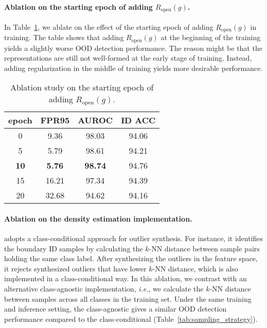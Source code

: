 \vspace{-0.7cm}
\paragraph{Ablation on the starting epoch of  adding $R_\text{open}(g)$.}  In Table~\ref{tab:beginning_epoch}, we ablate on the effect of the starting epoch of adding $R_{\text{open}}(g)$ in training. The table shows that adding $R_{\text{open}}(g)$ at the beginning of the training yields a slightly worse OOD detection performance. The reason might be that the representations are still not well-formed at the early stage of training. Instead, adding regularization in the middle of training yields more desirable performance. 

\begin{table}[!h]
    \centering
    \small 
    \vspace{-0.3cm}
    \caption{Ablation study on the starting epoch of adding $R_{\text{open}}(g)$.}
     \begin{tabular}{c|ccc}
      \toprule
     epoch& FPR95 & AUROC & ID ACC  \\
      \midrule
     0& 9.36	&98.03&	94.06   \\
      5	& 5.79	& 98.61& 	94.21 \\
     \textbf{10}	&\textbf{5.76}  & \textbf{98.74}   & 94.76\\
   15	&16.21&	97.34	&94.39\\
     20	&32.68	&94.62	&94.16\\
      \bottomrule
      \end{tabular}\label{tab:beginning_epoch}\vspace{-1em}
  \end{table}



\paragraph{Ablation on the density estimation implementation.} \model adopts a class-conditional approach for outlier synthesis. For instance, it identifies the boundary ID samples by calculating the $k$-NN distance between sample pairs holding the same class label. After synthesizing the outliers in the feature space, it rejects synthesized outliers that have lower $k$-NN distance, which is also implemented in a class-conditional way. In this ablation, we contrast with an alternative  class-agnostic implementation, \emph{i.e.}, we calculate the $k$-NN distance between samples across all classes in the training set. Under the same training and inference setting, the class-agnostic \model gives a similar OOD detection performance compared to the class-conditional \model (Table~\ref{tab:sampling_strategy}). 

